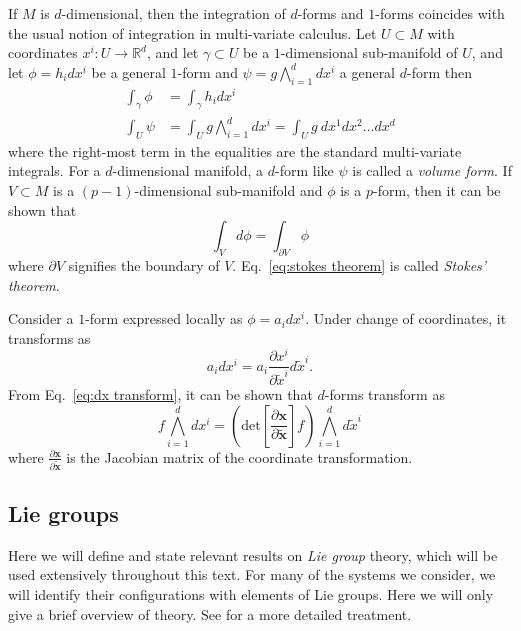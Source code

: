 If $M$ is $d$-dimensional, then the integration of $d$-forms and $1$-forms coincides with the usual notion of integration in multi-variate calculus. Let $U \subset M$ with coordinates $x^i : U \to \mathbb{R}^d$, and let $\gamma \subset U$ be a $1$-dimensional sub-manifold of $U$, and let $\phi = h_i dx^i$ be a general $1$-form and $\psi = g \bigwedge_{i=1}^d dx^i$ a general $d$-form then
\begin{subequations}
\begin{align}
\int_\gamma \phi & = \int_\gamma h_i d x^i \\
\int_U \psi & = \int_U g \bigwedge_{i=1}^d dx^i = \int_U g\ dx^1 dx^2 \dots dx^d
\end{align}
\end{subequations}
where the right-most term in the equalities are the standard multi-variate integrals. For a $d$-dimensional manifold, a $d$-form like $\psi$ is called a \textit{volume form}. If $V \subset M$ is a $(p-1)$-dimensional sub-manifold and $\phi$ is a $p$-form, then it can be shown that
\begin{equation} \label{eq:stokes theorem}
\int_V d \phi = \int_{\partial V} \phi
\end{equation}
where $\partial V$ signifies the boundary of $V$. Eq.~\ref{eq:stokes theorem} is called \textit{Stokes' theorem}.

Consider a $1$-form expressed locally as $\phi = a_i dx^i$. Under change of coordinates, it transforms as
\begin{equation} \label{eq:dx transform}
a_i dx^i = a_i \frac{\partial x^i}{\partial \tilde{x}^i} d\tilde{x}^i.
\end{equation}
From Eq.~\ref{eq:dx transform}, it can be shown that $d$-forms transform as
\begin{equation}
f \bigwedge_{i=1}^d dx^i = \left( \text{det} \left[ \frac{\partial \mathbf{x} }{ \partial \tilde{\mathbf{x}} } \right] f \right) \bigwedge_{i=1}^d d\tilde{x}^i
\end{equation}
where $\frac{\partial \mathbf{x} }{ \partial \tilde{\mathbf{x}} }$ is the Jacobian matrix of the coordinate transformation.

\subsection{Lie groups}

Here we will define and state relevant results on \textit{Lie group} theory, which will be used extensively throughout this text. For many of the systems we consider, we will identify their configurations with elements of Lie groups. Here we will only give a brief overview of theory. See \cite{clellandFrenetCartanMethod2017, schwichtenbergPhysicsSymmetry2017, hallLieGroupsLie2015} for a more detailed treatment.

